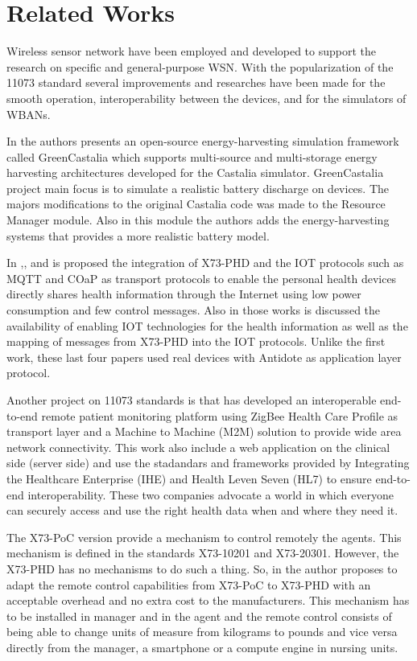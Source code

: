 \section{Related Works}\label{relatedworks}

Wireless sensor network have been employed and developed to support the research on specific and general-purpose WSN. 
With the popularization of the 11073 standard several improvements and researches have been made for the smooth operation, interoperability between the devices, and for the simulators of WBANs.

In \cite{b6} the authors presents an open-source energy-harvesting simulation framework called GreenCastalia which supports multi-source and multi-storage energy harvesting architectures developed for the Castalia simulator. GreenCastalia project main focus is to simulate a realistic battery discharge on devices. The majors modifications to the original Castalia code was made to the Resource Manager module. Also in this module the authors adds the energy-harvesting systems that provides a more realistic battery model.

In \cite{b7},\cite{b8},\cite{b9} and \cite{b10} is proposed the integration of X73-PHD and the IOT protocols such as MQTT and COaP as transport protocols to enable the personal health devices directly shares health information through the Internet using low power consumption and few control messages. Also in those works is discussed the availability of enabling IOT technologies for the health information as well as the mapping of messages from X73-PHD into the IOT protocols. Unlike the first work, these last four papers used real devices with Antidote as application layer protocol.

Another project on 11073 standards is \cite{b11} that has developed an interoperable  end-to-end remote patient monitoring platform using ZigBee Health Care Profile as transport layer and a Machine to Machine (M2M) solution to provide wide area network connectivity. This work also include a web application on the clinical side (server side) and use the stadandars and frameworks provided by Integrating the Healthcare Enterprise (IHE) \cite{b13} and Health Leven Seven (HL7) \cite{b12} to ensure end-to-end interoperability. These two companies advocate a world in which everyone can securely access and use the right health data when and where they need it.

The X73-PoC version provide a mechanism to control remotely the agents. This mechanism is defined in the standards X73-10201 and X73-20301. However, the X73-PHD has no mechanisms to do such a thing. So, in \cite{b14} the author proposes to adapt the remote control capabilities from X73-PoC to X73-PHD with an acceptable overhead and no extra cost to the manufacturers. This mechanism has to be installed in manager and in the agent and the remote control consists of being able to change units of measure from kilograms to pounds and vice versa directly from the manager, a smartphone or a compute engine in nursing units.
